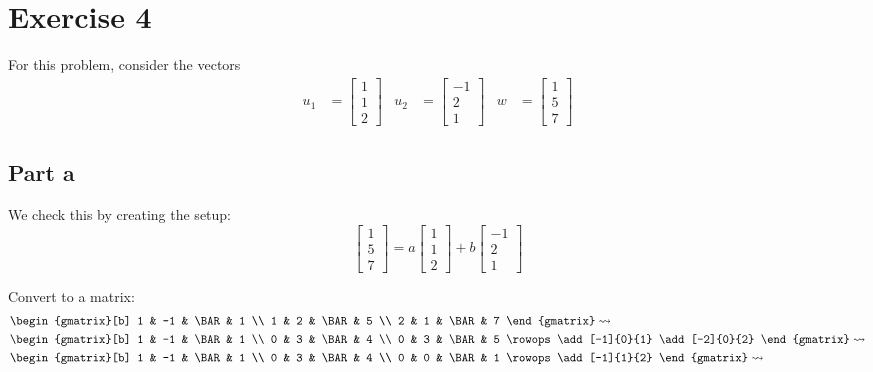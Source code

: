 \section{Exercise 4}
For this problem, consider the vectors
\begin{align*}
	u_1 & = \begin{bmatrix}1\\1\\2\end{bmatrix}  &
	u_2 & = \begin{bmatrix}-1\\2\\1\end{bmatrix} &
	w   & = \begin{bmatrix}1\\5\\7\end{bmatrix}
\end{align*}

\subsection{Part a}

We check this by creating the setup:
\[
	\begin{bmatrix}
		1 \\5\\7
	\end{bmatrix} = a\begin{bmatrix}
		1 \\1\\2
	\end{bmatrix} + b\begin{bmatrix}
		-1 \\2\\1
	\end{bmatrix}
\]

Convert to a matrix:
\begin{align*}
	 & \begin{gmatrix}[b]
		   1 & -1 & \BAR & 1 \\
		   1 & 2  & \BAR & 5 \\
		   2 & 1  & \BAR & 7
	   \end{gmatrix} \rightsquigarrow \\
	 & \begin{gmatrix}[b]
		   1 & -1 & \BAR & 1 \\
		   0 & 3  & \BAR & 4 \\
		   0 & 3  & \BAR & 5
		   \rowops
		   \add[-1]{0}{1}
		   \add[-2]{0}{2}
	   \end{gmatrix} \rightsquigarrow \\
	 & \begin{gmatrix}[b]
		   1 & -1 & \BAR & 1 \\
		   0 & 3  & \BAR & 4 \\
		   0 & 0  & \BAR & 1
		   \rowops
		   \add[-1]{1}{2}
	   \end{gmatrix} \rightsquigarrow \\
\end{align*}

